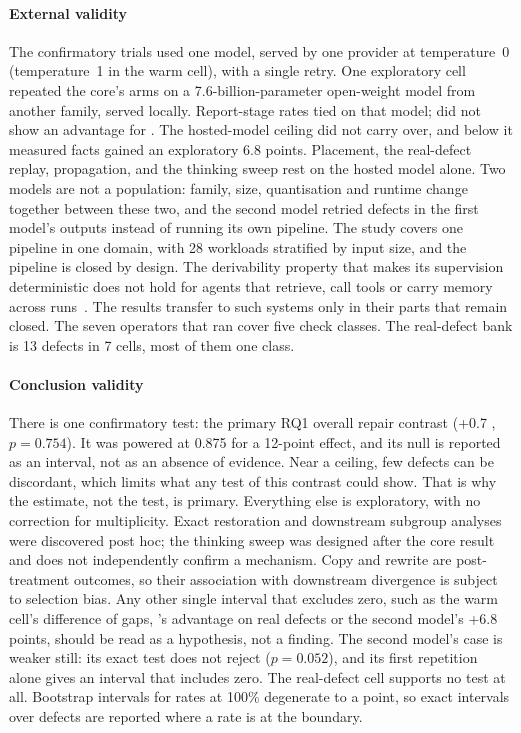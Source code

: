 \paragraph{External validity}
The confirmatory trials used one model, served by one provider at
temperature~0 (temperature~1 in the warm cell), with a single retry. One
exploratory cell repeated the core's arms on a 7.6-billion-parameter
open-weight model from another family, served locally. Report-stage rates tied on that model;  did not show an advantage for .
The hosted-model ceiling did not carry over, and below it measured facts gained an exploratory 6.8
points. Placement, the real-defect replay, propagation, and the thinking sweep
rest on the hosted model alone. Two models are not a population: family, size,
quantisation and runtime change together between these two, and the second
model retried defects in the first model's outputs instead of running its own
pipeline. The study covers one pipeline in one domain, with 28 workloads
stratified by input size, and the pipeline is closed by design. The derivability
property that makes its supervision deterministic does not hold for agents that
retrieve, call tools or carry memory across runs~\citep{hoang2026eas}. The
results transfer to such systems only in their parts that remain closed. The
seven operators that ran cover five check classes. The real-defect bank is 13
defects in 7 cells, most of them one class.

\paragraph{Conclusion validity}
There is one confirmatory test: the primary RQ1 overall repair contrast
(+0.7\pp{} , $p=0.754$). It was powered at 0.875 for a 12-point
effect, and its null is reported as an interval, not as an absence of evidence.
Near a ceiling, few defects can be discordant, which limits what any test of this
contrast could show. That is why the estimate, not the test, is primary.
Everything else is exploratory, with no correction for multiplicity. Exact
restoration and downstream subgroup analyses were discovered post hoc; the
thinking sweep was designed after the core result and does not independently
confirm a mechanism. Copy and rewrite are post-treatment outcomes, so their
association with downstream divergence is subject to selection bias. Any other single
interval that excludes zero, such as the warm cell's difference of gaps, 's
advantage on real defects or the second model's +6.8 points, should be read as a
hypothesis, not a finding. The second model's case is weaker still: its exact test
does not reject ($p=0.052$), and its first repetition alone gives an interval that
includes zero. The real-defect cell supports no test at all. Bootstrap intervals for
rates at 100\% degenerate to a point, so exact intervals over defects are
reported where a rate is at the boundary.
